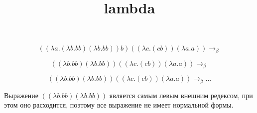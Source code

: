 \documentclass{article}
\title{lambda}
\begin{document}
\maketitle

\[
((\lambda a.(\lambda b.b b) (\lambda b.b b)) b) ((\lambda c.(c b)) (\lambda a.a)) \rightarrow_\beta
\]

\[
((\lambda b.b b)(\lambda b.b b))((\lambda c.(cb))(\lambda a.a)) 
\rightarrow_\beta
\]

\[
((\lambda b.bb)(\lambda b.bb))((\lambda c.(cb))(\lambda a.a))
\rightarrow_\beta ...
\]

Выражение $((\lambda b.bb)(\lambda b.bb))$ является самым левым внешним редексом, при этом оно расходится, поэтому все выражение не имеет нормальной формы.
\end{document}
